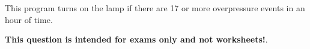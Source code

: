 





This program turns on the lamp if there are 17 or more overpressure events in an hour of time.







{\bf This question is intended for exams only and not worksheets!}.



